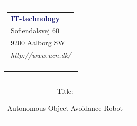 


% 
\thispagestyle{empty}
\begin{nopagebreak}
{\samepage 

\begin{tabular}{r}
\parbox{\textwidth}{  
\hfill \hspace{2cm} \parbox{8cm}{\begin{tabular}{l} %
{\small \textbf{\textcolor{MidnightBlue}{IT-technology}}}\\ 
{\small \textcolor{NavyBlue}{Sofiendalsvej 60}} \\
{\small \textcolor{NavyBlue}{9200 Aalborg SW}} \\
{\small \textcolor{NavyBlue}{\emph{http://www.ucn.dk/}}}
\end{tabular}}}
\end{tabular}

\begin{tabular}{cc}
\parbox{7cm}{
\begin{description}

\item { Title:} 

Autonomous Object Avoidance Robot

\end{description}

\parbox{8cm}{

}}
\end{tabular}}
\end{nopagebreak}
